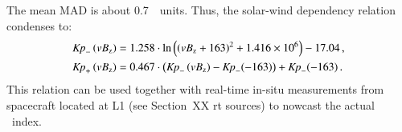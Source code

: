 \begin{figure}
\end{figure}
The mean MAD is about 0.7~\Kp{}~units. Thus, the solar-wind dependency relation condenses to:
\begin{align}
	\text{\textit{Kp}}_-\left(vB_\text{z}\right) &= 1.258 \cdot \ln\left(\left(vB_\text{z} + 163\right)^2 + \num{1.416e6}\right) - 17.04	\,,	\label{eq:kpvsvbz_dependency_function_negative}\\
	\text{\textit{Kp}}_+\left(vB_\text{z}\right) &= 0.467 \cdot \left(\text{\textit{Kp}}_-\left(vB_\text{z}\right) - \text{\textit{Kp}}_-(-163)\right) + \text{\textit{Kp}}_-(-163)	\,.	\label{eq:kpvsvbz_dependency_function_positive}
\end{align}
This relation can be used together with real-time in-situ measurements from spacecraft located at L1 (see Section~XX rt sources) to nowcast the actual \Kp~index.\\

